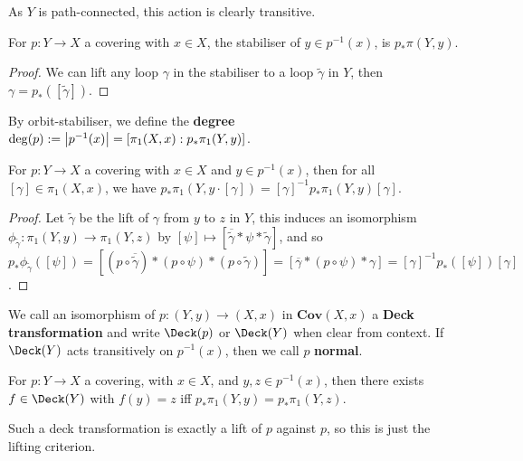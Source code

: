 \documentclass{article}
\begin{document}
As $Y$ is path-connected, this action is clearly transitive.

\begin{proposition}
    For $p:Y\rightarrow X$ a covering with $x\in X$, the stabiliser of $y\in p^{-1}(x)$, is $p_*\pi(Y,y)$.
    \begin{proof}
        We can lift any loop $\gamma$ in the stabiliser to a loop $\tilde{\gamma}$ in $Y$, then $\gamma=p_*([\tilde{\gamma}])$.
    \end{proof}
\end{proposition}

By orbit-stabiliser, we define the \textbf{degree} $\deg(p) :=\left| p^{-1}(x) \right| = [\pi_1(X,x):p_*\pi_1(Y,y)]$.

\begin{proposition}
    For $p:Y\rightarrow X$ a covering with $x\in X$ and $y\in p^{-1}(x)$, then for all $[\gamma]\in\pi_1(X,x)$, we have $p_*\pi_1(Y,y\cdot[\gamma]) = [\gamma]^{-1}p_*\pi_1(Y,y)[\gamma]$.
    \begin{proof}
        Let $\tilde{\gamma}$ be the lift of $\gamma$ from $y$ to $z$ in $Y$, this induces an isomorphism $\phi_{\tilde{\gamma}}:\pi_1(Y,y)\rightarrow\pi_1(Y,z)$ by $[\psi]\mapsto[\overline{\tilde{\gamma}}*\psi*\tilde{\gamma}]$, and so $p_*\phi_{\tilde{\gamma}}([\psi]) = [(p\circ\overline{\tilde{\gamma}})*(p\circ\psi)*(p\circ\tilde{\gamma})]= [\overline{\gamma}*(p\circ \psi) * \gamma] = [\gamma]^{-1}p_*([\psi])[\gamma]$.
    \end{proof}
\end{proposition}

\begin{definition}
    We call an isomorphism of $p:(Y,y)\rightarrow (X,x)$ in $\mathbf{Cov}(X,x)$ a \textbf{Deck transformation} and write $\Deck(p)$ or $\Deck(Y)$ when clear from context. If $\Deck(Y)$ acts transitively on $p^{-1}(x)$, then we call $p$ \textbf{normal}.
\end{definition}

\begin{proposition}
    For $p:Y\rightarrow X$ a covering, with $x\in X$, and $y,z\in p^{-1}(x)$, then there exists $f\in\Deck(Y)$ with $f(y)=z$ iff $p_*\pi_1(Y,y)=p_*\pi_1(Y,z)$.
    \begin{proposition}
        Such a deck transformation is exactly a lift of $p$ against $p$, so this is just the lifting criterion.
    \end{proposition}
\end{proposition}
\end{document}
